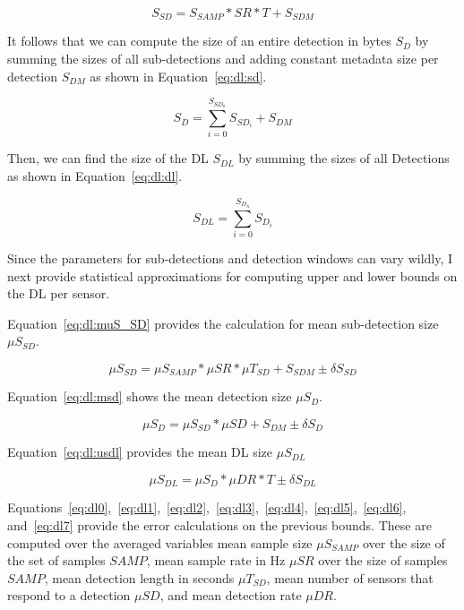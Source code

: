 \begin{equation}\label{eq:dl:ssd}
	S_{SD} = S_{SAMP} * SR * T + S_{SDM}
\end{equation}

It follows that we can compute the size of an entire detection in bytes $S_{D}$ by summing the sizes of all sub-detections and adding constant metadata size per detection $S_{DM}$ as shown in Equation~\ref{eq:dl:sd}.

\begin{equation}\label{eq:dl:sd}
	S_{D} = \sum_{i=0}^{S_{SD_{n}}} S_{SD_{i}} + S_{DM}
\end{equation}

Then, we can find the size of the DL $S_{DL}$ by summing the sizes of all Detections as shown in Equation~\ref{eq:dl:dl}.

\begin{equation}\label{eq:dl:dl}
	S_{DL} = \sum_{i=0}^{S_{D_{n}}} S_{D_{i}}
\end{equation}

Since the parameters for sub-detections and detection windows can vary wildly, I next provide statistical approximations for computing upper and lower bounds on the DL per sensor.

Equation~\ref{eq:dl:muS_SD} provides the calculation for mean sub-detection size $\mu S_{SD}$.

\begin{equation}\label{eq:dl:muS_SD}
	\mu S_{SD} = \mu S_{SAMP} * \mu SR * \mu T_{SD} + S_{SDM} \pm \delta S_{SD}
\end{equation}

Equation~\ref{eq:dl:msd} shows the mean detection size $\mu S_{D}$.

\begin{equation}\label{eq:dl:msd}
	\mu S_{D} = \mu S_{SD} * \mu SD + S_{DM} \pm \delta S_{D}
\end{equation}

Equation~\ref{eq:dl:usdl} provides the mean DL size $\mu S_{DL}$

\begin{equation}\label{eq:dl:usdl}
	\mu S_{DL} = \mu S_{D} * \mu DR * T \pm \delta S_{DL}
\end{equation}

Equations~\ref{eq:dl0},~\ref{eq:dl1},~\ref{eq:dl2},~\ref{eq:dl3},~\ref{eq:dl4},~\ref{eq:dl5},~\ref{eq:dl6}, and~\ref{eq:dl7} provide the error calculations on the previous bounds. These are computed over the averaged variables mean sample size $\mu S_{SAMP}$ over the size of the set of samples $SAMP$, mean sample rate in Hz $\mu SR$ over the size of samples $SAMP$, mean detection length in seconds $\mu T_{SD}$, mean number of sensors that respond to a detection $\mu SD$, and mean detection rate $\mu DR$.

